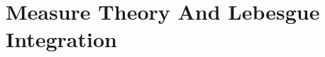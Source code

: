 \documentclass[12pt]{report}
\begin{document}
\tableofcontents

\part{Measure Theory And Lebesgue Integration}
    
\end{document}
